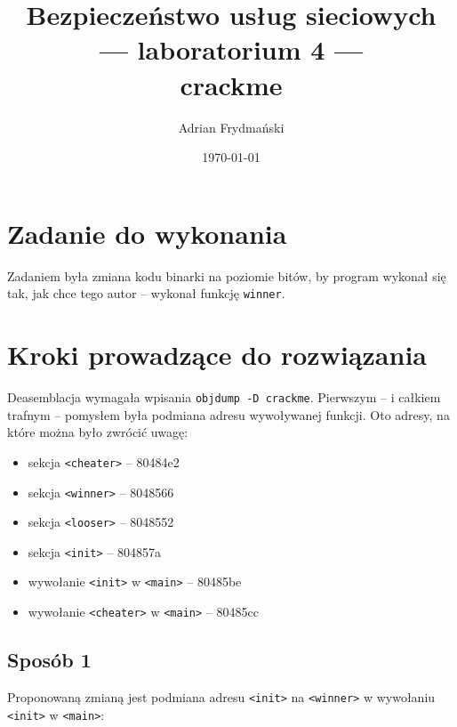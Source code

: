 \documentclass[a4paper]{article}
\title{Bezpieczeństwo usług sieciowych \\ --- laboratorium 4 --- \\ crackme}
\author{Adrian Frydmański}
\date{\today}
\begin{document}
	\maketitle
	
	\section{Zadanie do wykonania}
	Zadaniem była zmiana kodu binarki na poziomie bitów, by program wykonał się tak, jak chce tego autor -- wykonał funkcję \texttt{winner}.
	
	\section{Kroki prowadzące do rozwiązania}
	Deasemblacja wymagała wpisania \texttt{objdump -D crackme}. Pierwszym -- i całkiem trafnym -- pomysłem była podmiana adresu wywoływanej funkcji. Oto adresy, na które można było zwrócić uwagę:
	\begin{itemize}
		\item sekcja \texttt{<cheater>} -- 80484e2
		\item sekcja \texttt{<winner>} -- 8048566
		\item sekcja \texttt{<looser>} -- 8048552 
		\item sekcja \texttt{<init>} -- 804857a
		\item wywołanie \texttt{<init>} w \texttt{<main>} -- 80485be
		\item wywołanie \texttt{<cheater>} w \texttt{<main>} -- 80485cc
	\end{itemize}

	\subsection{Sposób 1}

	Proponowaną zmianą jest podmiana adresu \texttt{<init>} na \texttt{<winner>} w wywołaniu \texttt{<init>} w \texttt{<main>}:
	
\end{document}
